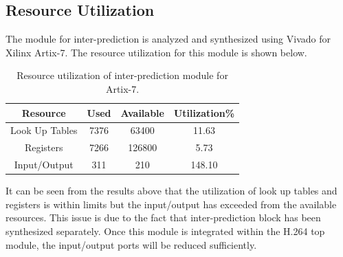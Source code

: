 \subsection{Resource Utilization}
The module for inter-prediction is analyzed and synthesized using Vivado for Xilinx Artix-7. The resource utilization for this module is shown below.
\begin{table}[H]
	\centering
	\begin{tabular}{|c|c|c|c|} \hline
		\textbf{Resource} & \textbf{Used} & \textbf{Available} & \textbf{Utilization\%}  \\ \hline
		Look Up Tables & 7376 & 63400 & 11.63 \\ \hline
		Registers & 7266 & 126800 & 5.73 \\ \hline
		Input/Output & 311 & 210 & 148.10 \\ \hline 
	\end{tabular}
	\caption{Resource utilization of inter-prediction module for Artix-7.}
	\label{tab:resource_me}
\end{table}

It can be seen from the results above that the utilization of look up tables and registers is within limits but the input/output has exceeded from the available resources. This issue is due to the fact that inter-prediction block has been synthesized separately. Once this module is integrated within the H.264 top module, the input/output ports will be reduced sufficiently.  

